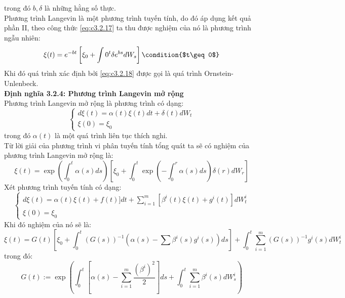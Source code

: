 \documentclass[14pt,a4paper]{article}
\numberwithin{equation}{section}
\begin{document}
trong đó $b,\delta$ là những hằng số thực.\\
Phương trình Langevin là một phương trình tuyến tính, do đó áp dụng kết quả phần II, theo công thức \eqref{eq:c3.2.17} ta thu được nghiệm của nó là phương trình ngẫu nhiên:
\begin{equation}\label{eq:c3.2.18}
	\xi(t)=e^{-bt}\left[\xi_0+\int{0}^{t}\delta e^{bs}dW_s \right] \condition{$t\geq 0$}
\end{equation}
Khi đó quá trình xác định bởi \eqref{eq:c3.2.18} được gọi là quá trình Ornstein-Unlenbeck.\\
\textbf{Định nghĩa 3.2.4: Phương trình Langevin mở rộng}\\
Phương trình Langevin mở rộng là phương trình có dạng:
\begin{equation}\label{eq:c3.2.19}
	\begin{cases}
		d\xi(t)=\alpha(t)\xi(t)dt+\delta(t)dW_t\\
		\xi(0)=\xi_0
	\end{cases}
\end{equation}
trong đó $\alpha(t)$ là một quá trình liên tục thích nghi.\\
Từ lời giải của phương trình vi phân tuyến tính tổng quát ta sẽ có nghiệm của phương trình Langevin mở rộng là:
\begin{equation}\label{eq:c3.2.20}
	\xi(t)=\exp\left(\int_{0}^{t}\alpha(s)ds\right)\left[\xi_0+\int_{0}^{t}\exp\left(-\int_{0}^{r}\alpha(s)ds \right)\delta(r)dW_r \right]
\end{equation}
Xét phương trình tuyến tính có dạng:
\begin{equation}\label{eq:c3.2.21}
	\begin{cases}
		d\xi(t)=\alpha(t)\xi(t)+f(t)]dt+\sum\limits_{i=1}^{m}\left[\beta^i(t)\xi(t)+g^i(t)\right]dW_t^i\\
		\xi(0)=\xi_0
	\end{cases}
\end{equation}
Khi đó nghiệm của nó sẽ là:
\begin{dmath}\label{eq:c3.2.22}
\xi(t)=G(t)\left[\xi_0+\int_{0}^{t}\left(G(s)\right)^{-1}\left(\alpha(s)-\sum\beta^i(s)g^i(s)\right)ds \right]+\int_{0}^{t}\sum\limits_{i=1}^{m}(G(s))^{-1}g^i(s)dW_t^i	
\end{dmath}
trong đó:
\begin{equation*}
	G(t):=\exp\left(\int_{0}^{t}\left[\alpha(s)-\sum_{i=1}^{m}\dfrac{(\beta^i)^2}{2} \right]ds+\int_{0}^{t}\sum_{i=1}^{m}\beta^i(s)dW_s^i \right)
\end{equation*}
\end{document}

